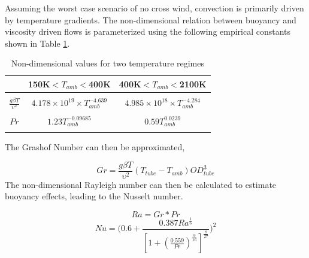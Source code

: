 \documentclass[heading.tex]{subfiles}
\begin{document}
Assuming the worst case scenario of no cross wind, convection is primarily driven by temperature gradients. The non-dimensional relation
between buoyancy and viscosity driven flows is parameterized using the following empirical constants shown in Table \ref{tab:NonDim}. \cite{Berton} \cite{Incropera}


\begin{table}
    \centering
    \caption{Non-dimensional values for two temperature regimes}
    \label{tab:NonDim}
    \begin{tabular}{ c  |  c |  c} 
        \hline
        & 150K$<T_{amb}<$400K & 400K$< T_{amb}<$2100K \\ \hline 
        &&\\
       $\frac{g \beta T} {\upsilon^2} $ & $4.178\times10^{19} \times T_{amb}^{-4.639}$ & $4.985\times10^{18} \times T_{amb}^{-4.284}$\\
       &&\\ 
        $Pr $ & $1.23 T_{amb}^{-0.09685}$ & $0.59 T_{amb}^{0.0239}$ \\
        &&\\  \hline
    \end{tabular}
\end{table}

The Grashof Number can then be approximated,

\begin{equation}
Gr = \frac{g \beta T} {\upsilon^2}  (T_{tube}-T_{amb}) {OD}_{tube}^3
\end{equation}
The non-dimensional Rayleigh number can then be calculated to estimate buoyancy effects, leading to the Nusselt number.

\begin{equation}
Ra = Gr * Pr
\end{equation}
\begin{equation}
Nu = \Bigg(0.6 + \frac{0.387Ra^{\frac{1}{6}}}{[1+(\frac{0.559}{Pr})^{\frac{9}{16}}]^{\frac{8}{27}}}\Bigg)^2
\end{equation}
\end{document}
